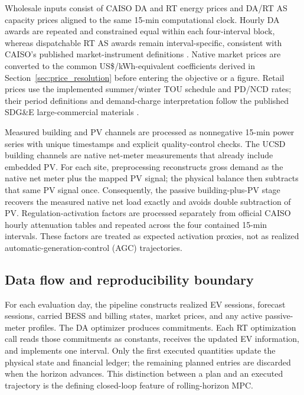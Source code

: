 \documentclass[final,5p,times]{elsarticle}
\begin{document}
Wholesale inputs consist of CAISO DA and RT energy prices and DA/RT AS capacity
prices aligned to the same 15-min computational clock. Hourly DA awards are
repeated and constrained equal within each four-interval block, whereas
dispatchable RT AS awards remain interval-specific, consistent with CAISO's
published market-instrument definitions \cite{caisoMarketInstruments2026} \cite{caisoMarketOperations2026}.
Native market prices are converted to the common US\$/kWh-equivalent
coefficients derived in Section~\ref{sec:price_resolution} before entering the
objective or a figure. Retail prices use the implemented summer/winter TOU
schedule and PD/NCD rates; their period definitions and demand-charge
interpretation follow the published SDG\&E large-commercial materials
\cite{sdgeLargeCommercial2025} \cite{sdgeDemandGuide2026}.

Measured building and PV channels are processed as nonnegative 15-min power series with unique timestamps and explicit quality-control checks. The UCSD building channels are native net-meter measurements that already include embedded PV. For each site, preprocessing reconstructs gross demand as the native net meter plus the mapped PV signal; the physical balance then subtracts that same PV signal once. Consequently, the passive building-plus-PV stage recovers the measured native net load exactly and avoids double subtraction of PV. Regulation-activation factors are processed separately from official CAISO hourly attenuation tables and repeated across the four contained 15-min intervals. These factors are treated as expected activation proxies, not as realized automatic-generation-control (AGC) trajectories.

\subsection{Data flow and reproducibility boundary}
For each evaluation day, the pipeline constructs realized EV sessions, forecast sessions, carried BESS and billing states, market prices, and any active passive-meter profiles. The DA optimizer produces commitments. Each RT optimization call reads those commitments as constants, receives the updated EV information, and implements one interval. Only the first executed quantities update the physical state and financial ledger; the remaining planned entries are discarded when the horizon advances. This distinction between a plan and an executed trajectory is the defining closed-loop feature of rolling-horizon MPC.
\end{document}
